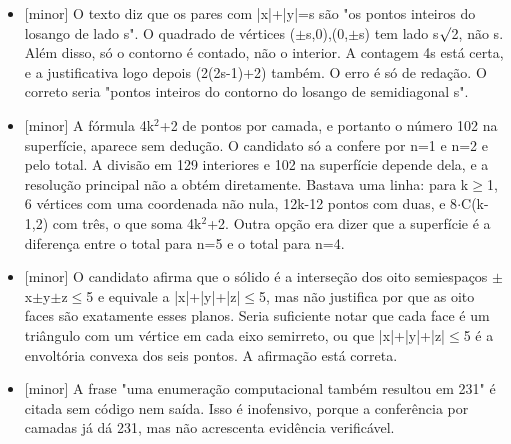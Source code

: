 \documentclass{article}%
\begin{document}
\begin{itemize}%
\item%
{[}minor{]} O texto diz que os pares com |x|+|y|=s são "os pontos inteiros do losango de lado s". O quadrado de vértices ($\pm$s,0),(0,$\pm$s) tem lado s$\surd$2, não s. Além disso, só o contorno é contado, não o interior. A contagem 4s está certa, e a justificativa logo depois (2(2s-1)+2) também. O erro é só de redação. O correto seria "pontos inteiros do contorno do losango de semidiagonal s".%
\item%
{[}minor{]} A fórmula 4k$^2$+2 de pontos por camada, e portanto o número 102 na superfície, aparece sem dedução. O candidato só a confere por n=1 e n=2 e pelo total. A divisão em 129 interiores e 102 na superfície depende dela, e a resolução principal não a obtém diretamente. Bastava uma linha: para k$\geq$1, 6 vértices com uma coordenada não nula, 12k-12 pontos com duas, e 8$\cdot$C(k-1,2) com três, o que soma 4k$^2$+2. Outra opção era dizer que a superfície é a diferença entre o total para n=5 e o total para n=4.%
\item%
{[}minor{]} O candidato afirma que o sólido é a interseção dos oito semiespaços $\pm$x$\pm$y$\pm$z$\leq$5 e equivale a |x|+|y|+|z|$\leq$5, mas não justifica por que as oito faces são exatamente esses planos. Seria suficiente notar que cada face é um triângulo com um vértice em cada eixo semirreto, ou que |x|+|y|+|z|$\leq$5 é a envoltória convexa dos seis pontos. A afirmação está correta.%
\item%
{[}minor{]} A frase "uma enumeração computacional também resultou em 231" é citada sem código nem saída. Isso é inofensivo, porque a conferência por camadas já dá 231, mas não acrescenta evidência verificável.%
\end{itemize}%
\end{document}

